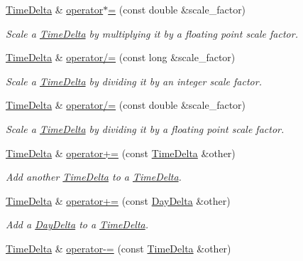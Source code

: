 \begin{DoxyCompactItemize}
\hyperlink{structTimeDelta}{Time\-Delta} \& \hyperlink{structTimeDelta_a8301b98264ca9539a160a756e4014559}{operator$\ast$=} (const double \&scale\-\_\-factor)
\begin{DoxyCompactList}\small\item\em Scale a \hyperlink{structTimeDelta}{Time\-Delta} by multiplying it by a floating point scale factor. \end{DoxyCompactList}\item 
\hyperlink{structTimeDelta}{Time\-Delta} \& \hyperlink{structTimeDelta_a463b413e8b1cba64356b70a52b542fbd}{operator/=} (const long \&scale\-\_\-factor)
\begin{DoxyCompactList}\small\item\em Scale a \hyperlink{structTimeDelta}{Time\-Delta} by dividing it by an integer scale factor. \end{DoxyCompactList}\item 
\hyperlink{structTimeDelta}{Time\-Delta} \& \hyperlink{structTimeDelta_ae514c2f5fa4266b53bb0220b89e50e54}{operator/=} (const double \&scale\-\_\-factor)
\begin{DoxyCompactList}\small\item\em Scale a \hyperlink{structTimeDelta}{Time\-Delta} by dividing it by a floating point scale factor. \end{DoxyCompactList}\item 
\hyperlink{structTimeDelta}{Time\-Delta} \& \hyperlink{structTimeDelta_ae8d415b1d359e1f6c6a68ee3c44ea21e}{operator+=} (const \hyperlink{structTimeDelta}{Time\-Delta} \&other)
\begin{DoxyCompactList}\small\item\em Add another \hyperlink{structTimeDelta}{Time\-Delta} to a \hyperlink{structTimeDelta}{Time\-Delta}. \end{DoxyCompactList}\item 
\hyperlink{structTimeDelta}{Time\-Delta} \& \hyperlink{structTimeDelta_acf4db7ce2e954d9a706f3e85cd805e42}{operator+=} (const \hyperlink{structDayDelta}{Day\-Delta} \&other)
\begin{DoxyCompactList}\small\item\em Add a \hyperlink{structDayDelta}{Day\-Delta} to a \hyperlink{structTimeDelta}{Time\-Delta}. \end{DoxyCompactList}\item 
\hyperlink{structTimeDelta}{Time\-Delta} \& \hyperlink{structTimeDelta_adcacf2fa162c98c9a8c7278f0e32ce56}{operator-\/=} (const \hyperlink{structTimeDelta}{Time\-Delta} \&other)

\end{DoxyCompactItemize}
